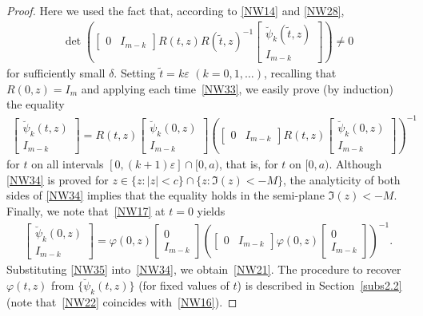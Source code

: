 \documentclass[11pt]{article}
\def\vp{\varphi}
\def\ve{\varepsilon}
\def\wt{\widetilde}
\numberwithin{equation}{section}
\begin{document}
\begin{proof}
\noindent
Here we used the fact that, according to \eqref{NW14} and \eqref{NW28},
\begin{gather*}
\det \left(
  \begin{bmatrix}0 &I_{m-k} \end{bmatrix}
 R(t,z)R(\wt t,z)^{-1}\begin{bmatrix}\breve \psi_k(\wt t,z) \\ I_{m-k} \end{bmatrix} \right)\not=0
\end{gather*}
for suf\/f\/iciently small $\delta$. Setting $\wt t=k\ve \,\, (k=0,1, \ldots)$, recalling that $R(0,z)=I_m$ and applying each time~\eqref{NW33}, we easily prove (by induction) the equality
\begin{gather} \label{NW34}
\begin{bmatrix}\breve \psi_k( t,z) \\ I_{m-k} \end{bmatrix}
=
R(t,z)\begin{bmatrix}\breve \psi_k(0,z) \\ I_{m-k} \end{bmatrix}
 \left(
  \begin{bmatrix}0 &I_{m-k} \end{bmatrix}
 R(t,z)\begin{bmatrix}\breve \psi_k(0,z) \\ I_{m-k} \end{bmatrix} \right)^{-1}
\end{gather}
for $t$ on all intervals $[0, (k+1) \ve]\cap [0,a)$, that is, for $t$ on $[0,a)$. Although
\eqref{NW34} is proved for $ z \in \{z \colon |z|<c\}\cap \{z \colon \Im(z)<-M\}$, the analyticity
of both sides of \eqref{NW34} implies that the equality holds in the semi-plane $\Im(z)<-M$.
Finally, we note that~\eqref{NW17} at $t=0$ yields
\begin{gather} \label{NW35}
\begin{bmatrix}\breve \psi_k( 0,z) \\ I_{m-k} \end{bmatrix}
=
\vp(0,z)\begin{bmatrix}0 \\ I_{m-k} \end{bmatrix}
 \left(
  \begin{bmatrix}0 &I_{m-k} \end{bmatrix}
 \vp(0,z)\begin{bmatrix} 0 \\ I_{m-k} \end{bmatrix} \right)^{-1}.
\end{gather}
Substituting \eqref{NW35} into~\eqref{NW34}, we obtain~\eqref{NW21}. The procedure to recover
$\vp(t,z)$ from $\{\breve \psi_k(t,z)\}$ (for f\/ixed values of $t$) is described in Section~\ref{subs2.2}
(note that~\eqref{NW22} coincides with~\eqref{NW16}).
\end{proof}
\end{document}
